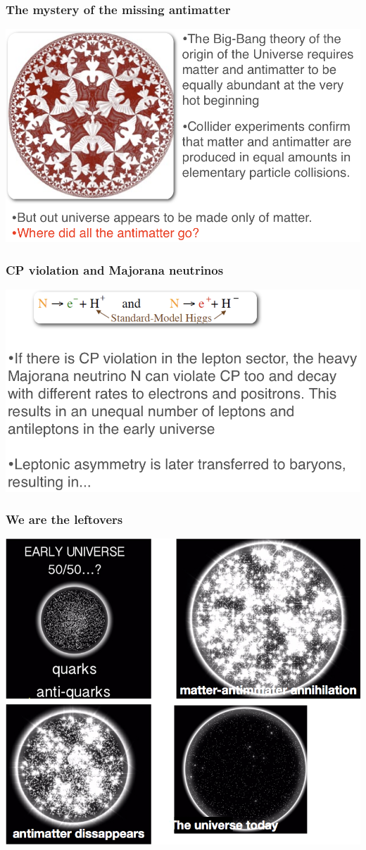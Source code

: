 \begin{frame}
\frametitle{The mystery of the missing antimatter}
\includegraphics[scale=0.30]{img/MissingAntiMatter.png}
\end{frame}

\begin{frame}
\frametitle{CP violation and Majorana neutrinos}
\includegraphics[scale=0.30]{img/CP.png}
\end{frame}

\begin{frame}
\frametitle{We are the leftovers}
\includegraphics[scale=0.30]{img/MissingUniverse.png}
\end{frame}
%

